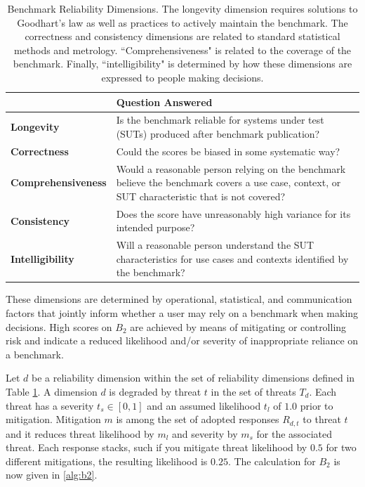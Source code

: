 \documentclass{article}
\newcommand\bb{$B_2$ }
\begin{document}
\begin{table}[h!]
  \caption{Benchmark Reliability Dimensions. The longevity dimension requires solutions to Goodhart's law as well as practices to actively maintain the benchmark. The correctness and consistency dimensions are related to standard statistical methods and metrology. ``Comprehensiveness" is related to the coverage of the benchmark. Finally, ``intelligibility" is determined by how these dimensions are expressed to people making decisions.}
  \label{tab:benchmark-reliability-dimensions}
\label{tab:dimensions}
  \centering
  \begin{tabular}{lp{10cm}}
    \toprule
    & \textbf{Question Answered} \\
    \midrule
    \textbf{Longevity} & Is the benchmark reliable for systems under test (SUTs) produced after benchmark publication? \\
    \textbf{Correctness} & Could the scores be biased in some systematic way? \\
    \textbf{Comprehensiveness} & Would a reasonable person relying on the benchmark believe the benchmark covers a use case, context, or SUT characteristic that is not covered? \\
    \textbf{Consistency} & Does the score have unreasonably high variance for its intended purpose? \\
    \textbf{Intelligibility} & Will a reasonable person understand the SUT characteristics for use cases and contexts identified by the benchmark? \\
    \bottomrule
  \end{tabular}
\end{table}

These dimensions are determined by operational, statistical, and communication factors that jointly inform whether a user may rely on a benchmark when making decisions. High scores on \bb are achieved by means of mitigating or controlling risk and indicate a reduced likelihood and/or severity of inappropriate reliance on a benchmark.

Let $d$ be a reliability dimension within the set of reliability dimensions defined in Table \ref{tab:dimensions}. A dimension $d$ is degraded by threat $t$ in the set of threats $T_d$. Each threat has a severity $t_s\in{[0,1]}$ and an assumed likelihood $t_l$ of $1.0$ prior to mitigation. Mitigation $m$ is among the set of adopted responses $R_{d,t}$ to threat $t$ and it reduces threat likelihood by $m_l$ and severity by $m_s$ for the associated threat. Each response stacks, such if you mitigate threat likelihood by $0.5$ for two different mitigations, the resulting likelihood is $0.25$. The calculation for \bb is now given in \ref{alg:b2}.
\end{document}
